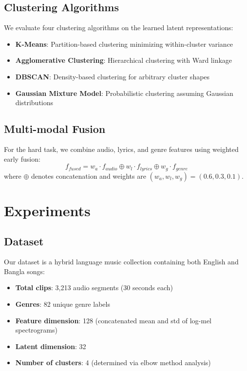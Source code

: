 \documentclass{article}
\begin{document}
\subsection{Clustering Algorithms}

We evaluate four clustering algorithms on the learned latent representations:

\begin{itemize}
    \item \textbf{K-Means}: Partition-based clustering minimizing within-cluster variance
    \item \textbf{Agglomerative Clustering}: Hierarchical clustering with Ward linkage
    \item \textbf{DBSCAN}: Density-based clustering for arbitrary cluster shapes
    \item \textbf{Gaussian Mixture Model}: Probabilistic clustering assuming Gaussian distributions
\end{itemize}

\subsection{Multi-modal Fusion}
For the hard task, we combine audio, lyrics, and genre features using weighted early fusion:
\begin{equation}
f_{fused} = w_a \cdot f_{audio} \oplus w_l \cdot f_{lyrics} \oplus w_g \cdot f_{genre}
\end{equation}
where $\oplus$ denotes concatenation and weights are $(w_a, w_l, w_g) = (0.6, 0.3, 0.1)$.

\section{Experiments}

\subsection{Dataset}
Our dataset is a hybrid language music collection containing both English and Bangla songs:
\begin{itemize}
    \item \textbf{Total clips}: 3,213 audio segments (30 seconds each)
    \item \textbf{Genres}: 82 unique genre labels
    \item \textbf{Feature dimension}: 128 (concatenated mean and std of log-mel spectrograms)
    \item \textbf{Latent dimension}: 32
    \item \textbf{Number of clusters}: 4 (determined via elbow method analysis)
\end{itemize}
\end{document}
